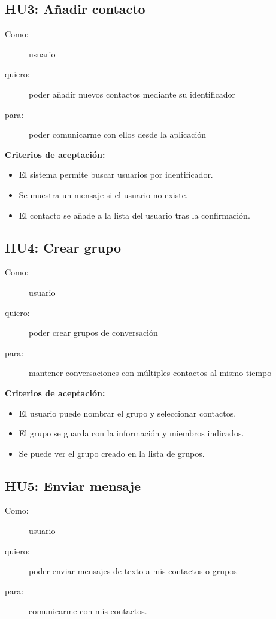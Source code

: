 \subsection*{HU3: Añadir contacto}
\begin{description}
  \item[Como:] usuario
  \item[quiero:] poder añadir nuevos contactos mediante su identificador
  \item[para:] poder comunicarme con ellos desde la aplicación
\end{description}

\textbf{Criterios de aceptación:}
\begin{itemize}
    \item El sistema permite buscar usuarios por identificador.
    \item Se muestra un mensaje si el usuario no existe.
    \item El contacto se añade a la lista del usuario tras la confirmación.
\end{itemize}

\subsection*{HU4: Crear grupo}
\begin{description}
  \item[Como:] usuario
  \item[quiero:] poder crear grupos de conversación
  \item[para:] mantener conversaciones con múltiples contactos al mismo tiempo
\end{description}

\textbf{Criterios de aceptación:}
\begin{itemize}
    \item El usuario puede nombrar el grupo y seleccionar contactos.
    \item El grupo se guarda con la información y miembros indicados.
    \item Se puede ver el grupo creado en la lista de grupos.
\end{itemize}

\subsection*{HU5: Enviar mensaje}
\begin{description}
  \item[Como:] usuario
  \item[quiero:] poder enviar mensajes de texto a mis contactos o grupos
  \item[para:] comunicarme con mis contactos.
\end{description}

